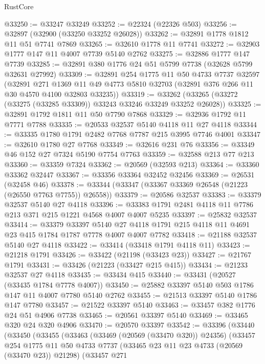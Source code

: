 \begin{lexlean}{RustCore}
\begin{coremodule}
@33250 := @33247 @33249
@33252 := @22324 (@22326 @503)
@33256 := @32897 (@32900 (@33250 @33252 @26028))
@33262 := @32891 @1778 @1812 @11 @51 @7741 @7869
@33265 := @32610 @1778 @11 @7741
@33272 := @32903 @1777 @147 @11 @4007 @7739 @5140 @2762
@33275 := @32886 @1777 @147 @7739
@33285 := @32891 @380 @1776 @24 @51 @5799 @7738 (@32628 @5799 @32631 @27992)
@33309 := @32891
    @254
    @1775
    @11
    @50
    @4733
    @7737
    @32597
    (@32891
      @271
      @1369
      @11
      @49
      @4773
      @5810
      @32703
      (@32891 @376 @266 @11 @30 @4570 @4100 @32803 @33235))
@33319 := @33262 (@33265 (@33272 (@33275 (@33285 @33309)) @33243 @33246 @33249 @33252 @26028))
@33325 := @32891 @1792 @1811 @11 @50 @7790 @7868
@33329 := @32936 @1792 @11 @7771 @7788
@33335 := @20533 @32537 @5140 @4118 @11 @27 @4118
@33344 := @33335 @1780 @1791 @2482 @7768 @7787 @215 @3995 @7746 @4001
@33347 := @32610 @1780 @27 @7768
@33349 := @32616 @231 @76
@33356 := @33349 @46 @152 @27 @7324 @5190 @7754 @7763
@33359 := @32588 @213 @77 @213
@33360 := @33359 @7324
@33362 := @20569 (@32593 @213)
@33364 := @33360 @33362 @32447
@33367 := @33356 @33364 @32452 @32456
@33369 := @26531 (@32458 @46)
@33378 := @33344 (@33347 (@33367 @33369 @26548 (@21223 (@26550 @7763 @7755)) @26558))
@33379 := @20586 @32537
@33383 := @33379 @32537 @5140 @27 @4118
@33396 := @33383 @1791 @2481 @4118 @11 @7786 @213 @371 @215 @1221 @4568 @4007 @4007 @5235
@33397 := @25832 @32537
@33414 := @33379
    @33397
    @5140
    @27
    @4118
    @1791
    @215
    @4118
    @11
    @4691
    @23
    @415
    @1784
    @1787
    @7778
    @4007
    @4007
    @7782
@33418 := @21188 @32537 @5140 @27 @4118
@33422 := @33414 (@33418 @1791 @4118 @11)
@33423 := @21218 @1791
@33426 := @33422 (@21198 (@33423 @23))
@33427 := @21767 @1791
@33431 := @33426 (@21223 (@33427 @215 @415))
@33434 := @21233 @32537 @27 @4118
@33435 := @33434 @415
@33440 := @33431 (@20527 (@33435 @1784 @7778 @4007))
@33450 := @25882 @33397 @5140 @503 @1786 @147 @11 @4007 @7780 @5140 @2762
@33455 := @21513 @33397 @5140 @1786 @147 @7780
@33457 := @21522 @33397 @5140
@33463 := @33457 @382 @1776 @24 @51 @4906 @7738
@33465 := @20561 @33397 @5140
@33469 := @33465 @320 @24 @320 @4906
@33470 := @20570 @33397
@33542 := @33396
    (@33440
      (@33450
        (@33455
          (@33463
            (@33469 (@20569 (@33470 @320)) @24356)
            (@33457
              @254
              @1775
              @11
              @50
              @4733
              @7737
              (@33465 @23 @11 @23 @4733 (@20569 (@33470 @23)) @21298)
              (@33457
                @271

\end{coremodule}
\end{lexlean}
